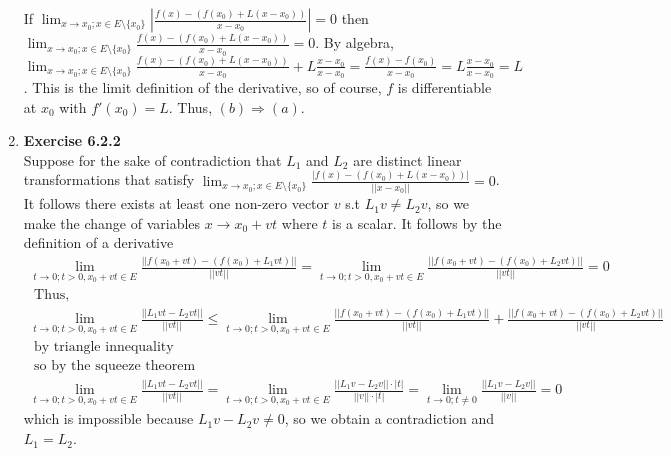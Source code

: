 \documentclass[10pt]{article}
\begin{document}
\begin{enumerate}[label=Problem \arabic*.]
    If $\displaystyle\lim_{x\rightarrow x_0;x\in E\setminus\{x_0\}}|\frac{f(x)-(f(x_0)+L(x-x_0))}{x-x_0}|=0$ then $\displaystyle\lim_{x\rightarrow x_0;x\in E\setminus\{x_0\}}\frac{f(x)-(f(x_0)+L(x-x_0))}{x-x_0}=0$.
    By algebra,$\displaystyle\lim_{x\rightarrow x_0;x\in E\setminus\{x_0\}}\frac{f(x)-(f(x_0)+L(x-x_0))}{x-x_0}+L\frac{x-x_0}{x-x_0}=\frac{f(x)-f(x_0)}{x-x_0}=L\frac{x-x_0}{x-x_0}=L$.
    This is the limit definition of the derivative, so of course, $f$ is differentiable at $x_0$ with $f'(x_0)=L$. Thus, $(b)\Rightarrow(a)$.
    \item \textbf{Exercise 6.2.2}\\
    Suppose for the sake of contradiction that $L_1$ and $L_2$ are distinct linear transformations that satisfy $\displaystyle\lim_{x\rightarrow x_0;x\in E\setminus\{x_0\}}\frac{|f(x)-(f(x_0)+L(x-x_0))|}{||x-x_0||}=0$.
    It follows there exists at least one non-zero vector $v$ s.t $L_1v\neq L_2v$, so we make the change of variables $x\rightarrow x_0+vt$ where $t$ is a scalar.
    It follows by the definition of a derivative
    \begin{align*}
        \lim_{t\rightarrow0;t>0,x_0+vt\in E}\frac{||f(x_0+vt)-(f(x_0)+L_1vt)||}{||vt||}=\lim_{t\rightarrow0;t>0,x_0+vt\in E}\frac{||f(x_0+vt)-(f(x_0)+L_2vt)||}{||vt||}=0\\ \text{ Thus, }\\
        \lim_{t\rightarrow0;t>0,x_0+vt\in E}\frac{||L_1vt-L_2vt||}{||vt||}\le\lim_{t\rightarrow0;t>0,x_0+vt\in E}\frac{||f(x_0+vt)-(f(x_0)+L_1vt)||}{||vt||}+\frac{||f(x_0+vt)-(f(x_0)+L_2vt)||}{||vt||}\\ \text{ by triangle innequality}\\
        \text{ so by the squeeze theorem}\\ \lim_{t\rightarrow0;t>0,x_0+vt\in E}\frac{||L_1vt-L_2vt||}{||vt||}=\lim_{t\rightarrow0;t>0,x_0+vt\in E}\frac{||L_1v-L_2v||\cdot|t|}{||v||\cdot|t|}=\lim_{t\rightarrow0;t\neq0}\frac{||L_1v-L_2v||}{||v||}=0
    \end{align*}
    which is impossible because $L_1v-L_2v\neq0$, so we obtain a contradiction and $L_1=L_2$.
\end{enumerate}
\end{document}
